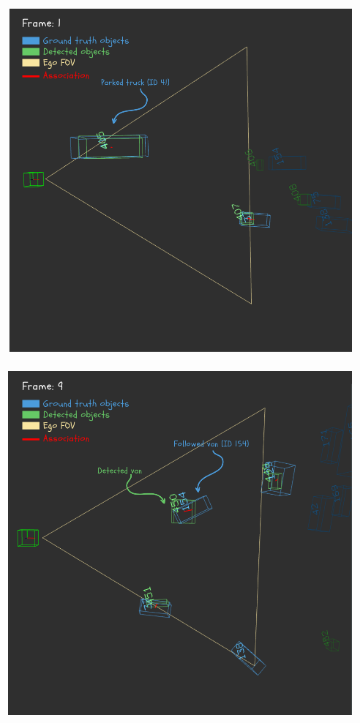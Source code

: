 \begin{figure}[!ht]
    \centering
    \begin{subfigure}[b]{0.32\textwidth}
        \includegraphics[width=\linewidth]{images/experiments/evaluation_frames/3d_evaluation_frame_1_canva.png}
        \caption{}
        \label{fig:scene_open3d_cases_a}
    \end{subfigure}
    \hfill
    \begin{subfigure}[b]{0.32\textwidth}
        \includegraphics[width=\textwidth]{images/experiments/evaluation_frames/3d_evaluation_frame_9_canva.png}

\end{subfigure}
\end{figure}
